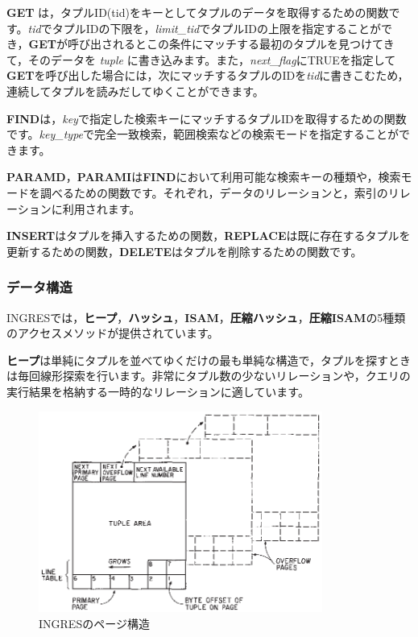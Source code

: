{\bf GET} は，タプルID(tid)をキーとしてタプルのデータを取得するための関数です。{\it tid}でタプルIDの下限を，{\it limit\_tid}でタプルIDの上限を指定することができ，{\bf GET}が呼び出されるとこの条件にマッチする最初のタプルを見つけてきて，そのデータを {\it tuple} に書き込みます。また，{\it next\_flag}にTRUEを指定して{\bf GET}を呼び出した場合には，次にマッチするタプルのIDを{\it tid}に書きこむため，連続してタプルを読みだしてゆくことができます。


{\bf FIND}は，{\it key}で指定した検索キーにマッチするタプルIDを取得するための関数です。{\it key\_type}で完全一致検索，範囲検索などの検索モードを指定することができます。


{\bf PARAMD}，{\bf PARAMI}は{\bf FIND}において利用可能な検索キーの種類や，検索モードを調べるための関数です。それぞれ，データのリレーションと，索引のリレーションに利用されます。


{\bf INSERT}はタプルを挿入するための関数，{\bf REPLACE}は既に存在するタプルを更新するための関数，{\bf DELETE}はタプルを削除するための関数です。


\subsubsection{データ構造}


INGRESでは，{\bf ヒープ}，{\bf ハッシュ}，{\bf ISAM}，{\bf 圧縮ハッシュ}，{\bf 圧縮ISAM}の5種類のアクセスメソッドが提供されています。


{\bf ヒープ}は単純にタプルを並べてゆくだけの最も単純な構造で，タプルを探すときは毎回線形探索を行います。非常にタプル数の少ないリレーションや，クエリの実行結果を格納する一時的なリレーションに適しています。


\begin{figure}[tb]
 \begin{center}
  \includegraphics[height=66mm]{images/page-layout-ingres.eps}
  \caption{INGRESのページ構造}
  \label{174456_16Jul12}
 \end{center}
\end{figure}


